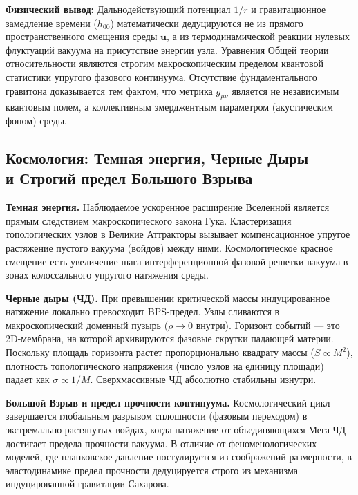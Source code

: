 \documentclass[11pt,a4paper]{article}
\begin{document}
	\textbf{Физический вывод:} Дальнодействующий потенциал $1/r$ и гравитационное замедление времени ($h_{00}$) математически дедуцируются не из прямого пространственного смещения среды $\mathbf{u}$, а из термодинамической реакции нулевых флуктуаций вакуума на присутствие энергии узла. Уравнения Общей теории относительности являются строгим макроскопическим пределом квантовой статистики упругого фазового континуума. Отсутствие фундаментального гравитона доказывается тем фактом, что метрика $g_{\mu\nu}$ является не независимым квантовым полем, а коллективным эмерджентным параметром (акустическим фоном) среды.
	
	\subsection{Космология: Темная энергия, Черные Дыры\\ и Строгий предел Большого Взрыва}
	\textbf{Темная энергия.} Наблюдаемое ускоренное расширение Вселенной является прямым следствием макроскопического закона Гука. Кластеризация топологических узлов в Великие Аттракторы вызывает компенсационное упругое растяжение пустого вакуума (войдов) между ними. Космологическое красное смещение есть увеличение шага интерференционной фазовой решетки вакуума в зонах колоссального упругого натяжения среды.
	
	\textbf{Черные дыры (ЧД).} При превышении критической массы индуцированное натяжение локально превосходит BPS-предел. Узлы сливаются в макроскопический доменный пузырь ($\rho \to 0$ внутри). Горизонт событий — это 2D-мембрана, на которой архивируются фазовые скрутки падающей материи. Поскольку площадь горизонта растет пропорционально квадрату массы ($S \propto M^2$), плотность топологического напряжения (число узлов на единицу площади) падает как $\sigma \propto 1/M$. Сверхмассивные ЧД абсолютно стабильны изнутри.
	
	\textbf{Большой Взрыв и предел прочности континуума.} 
	Космологический цикл завершается глобальным разрывом сплошности (фазовым переходом) в экстремально растянутых войдах, когда натяжение от объединяющихся Мега-ЧД достигает предела прочности вакуума. В отличие от феноменологических моделей, где планковское давление постулируется из соображений размерности, в эластодинамике предел прочности дедуцируется строго из механизма индуцированной гравитации Сахарова.
	
\end{document}
